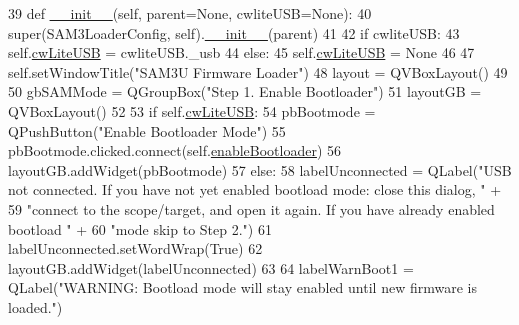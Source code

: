 \begin{DoxyCode}
39     \textcolor{keyword}{def }\hyperlink{classsoftware_1_1chipwhisperer_1_1capture_1_1scopes_1_1cwhardware_1_1ChipWhispererSAM3Update_1_1SAM3LoaderConfig_a381309e722e08946a6c8397949cf07b0}{\_\_init\_\_}(self, parent=None, cwliteUSB=None):
40         super(SAM3LoaderConfig, self).\hyperlink{classsoftware_1_1chipwhisperer_1_1capture_1_1scopes_1_1cwhardware_1_1ChipWhispererSAM3Update_1_1SAM3LoaderConfig_a381309e722e08946a6c8397949cf07b0}{\_\_init\_\_}(parent)
41 
42         \textcolor{keywordflow}{if} cwliteUSB:
43             self.\hyperlink{classsoftware_1_1chipwhisperer_1_1capture_1_1scopes_1_1cwhardware_1_1ChipWhispererSAM3Update_1_1SAM3LoaderConfig_ab6c5f4b307669348e28b7f1bcf7ea902}{cwLiteUSB} = cwliteUSB.\_usb
44         \textcolor{keywordflow}{else}:
45             self.\hyperlink{classsoftware_1_1chipwhisperer_1_1capture_1_1scopes_1_1cwhardware_1_1ChipWhispererSAM3Update_1_1SAM3LoaderConfig_ab6c5f4b307669348e28b7f1bcf7ea902}{cwLiteUSB} = \textcolor{keywordtype}{None}
46 
47         self.setWindowTitle(\textcolor{stringliteral}{"SAM3U Firmware Loader"})
48         layout = QVBoxLayout()
49 
50         gbSAMMode = QGroupBox(\textcolor{stringliteral}{"Step 1. Enable Bootloader"})
51         layoutGB = QVBoxLayout()
52 
53         \textcolor{keywordflow}{if} self.\hyperlink{classsoftware_1_1chipwhisperer_1_1capture_1_1scopes_1_1cwhardware_1_1ChipWhispererSAM3Update_1_1SAM3LoaderConfig_ab6c5f4b307669348e28b7f1bcf7ea902}{cwLiteUSB}:
54             pbBootmode = QPushButton(\textcolor{stringliteral}{"Enable Bootloader Mode"})
55             pbBootmode.clicked.connect(self.\hyperlink{classsoftware_1_1chipwhisperer_1_1capture_1_1scopes_1_1cwhardware_1_1ChipWhispererSAM3Update_1_1SAM3LoaderConfig_af04721d996f948673d8d63d5197d6e40}{enableBootloader})
56             layoutGB.addWidget(pbBootmode)
57         \textcolor{keywordflow}{else}:
58             labelUnconnected = QLabel(\textcolor{stringliteral}{"USB not connected. If you have not yet enabled bootload mode: close
       this dialog, "} +
59                                       \textcolor{stringliteral}{"connect to the scope/target, and open it again. If you have already
       enabled bootload "} +
60                                       \textcolor{stringliteral}{"mode skip to Step 2."})
61             labelUnconnected.setWordWrap(\textcolor{keyword}{True})
62             layoutGB.addWidget(labelUnconnected)
63 
64         labelWarnBoot1 = QLabel(\textcolor{stringliteral}{"WARNING: Bootload mode will stay enabled until new firmware is loaded."})

\end{DoxyCode}
